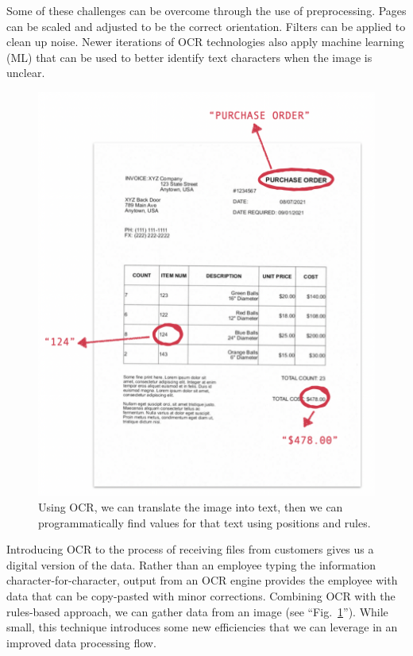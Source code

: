 \documentclass[conference]{IEEEtran}
\begin{document}
Some of these challenges can be overcome through the use of preprocessing. Pages can be scaled and adjusted to be the correct orientation. Filters can be applied to clean up noise. Newer iterations of OCR technologies also apply machine learning (ML) that can be used to better identify text characters when the image is unclear.

\begin{figure}[ht]
\centerline{\includegraphics[width=\columnwidth]{RulesBasedOCR.png}}
\caption{Using OCR, we can translate the image into text, then we can programmatically find values for that text using positions and rules.}
\label{figRulesBasedOCR}
\end{figure}

Introducing OCR to the process of receiving files from customers gives us a digital version of the data. Rather than an employee typing the information character-for-character, output from an OCR engine provides the employee with data that can be copy-pasted with minor corrections. Combining OCR with the rules-based approach, we can gather data from an image (see ``Fig.~\ref{figRulesBasedOCR}'').  While small, this technique introduces some new efficiencies that we can leverage in an improved data processing flow.
\end{document}
